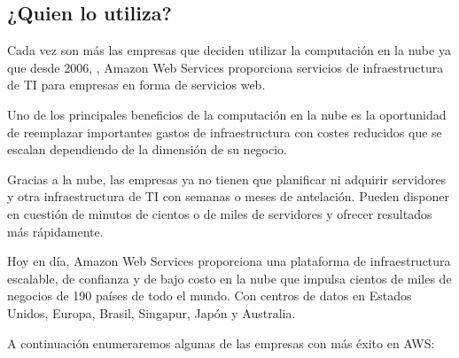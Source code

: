 \subsection{¿Quien lo utiliza?}

Cada vez son más las empresas que deciden utilizar la computación en la nube ya que desde 2006, , Amazon Web Services proporciona servicios de infraestructura de TI para empresas en forma de servicios web.

Uno de los principales beneficios de la computación en la nube es la oportunidad de reemplazar importantes gastos de infraestructura con costes reducidos que se escalan dependiendo de la dimensión de su negocio.

Gracias a la nube, las empresas ya no tienen que planificar ni adquirir servidores y otra infraestructura de TI con semanas o meses de antelación. Pueden disponer en cuestión de minutos de cientos o de miles de servidores y ofrecer resultados más rápidamente.

Hoy en día, Amazon Web Services proporciona una plataforma de infraestructura escalable, de confianza y de bajo costo en la nube que impulsa cientos de miles de negocios de 190 países de todo el mundo. Con centros de datos en Estados Unidos, Europa, Brasil, Singapur, Japón y Australia.

A continuación enumeraremos algunas de las empresas con más éxito en AWS:

